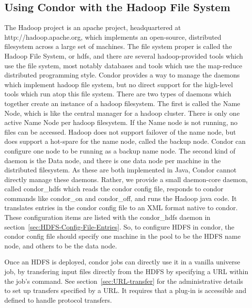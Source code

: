 \subsection{\label{sec:Condor-HDFS}Using Condor with the Hadoop File System}

The Hadoop project is an apache project, headquartered at http://hadoop.apache.org, 
which implements an open-source, distributed filesystem across a large set
of machines.  The file system proper is called the Hadoop File System, or hdfs, and 
there are several hadoop-provided tools which use the file system, most notably
databases and tools which use the map-reduce distributed programming style.  Condor
provides a way to manage the daemons which implement hadoop file system, but no
direct support for the high-level tools which run atop this file system.  There
are two types of daemons which together create an instance of a hadoop filesystem.
The first is called the Name Node, which is like the central manager for a 
hadoop cluster.  There is only one active Name Node per hadoop filesystem.  If
the Name node is not running, no files can be accessed.  Hadoop does not support
failover of the name node, but does support a hot-spare for the name node, called
the backup node.  Condor can configure one node to be running as a backup name node.
The second
kind of daemon is the Data node, and there is one data node per machine in the 
distributed filesystem.  As these are both implemented in Java, Condor cannot directly
manage these daemons.  Rather, we provide a small daemon-core daemon, called
condor\_hdfs which reads the condor config file, responds to condor commands like
condor\_on and condor\_off, and runs the Hadoop java code.  It translates entries
in the condor config file to an XML format native to condor.  These configuration
items are listed with the condor\_hdfs daemon in section~\ref{sec:HDFS-Config-File-Entries}. 
So, to configure HDFS in condor, the condor config file should specify one machine in the
pool to be the HDFS name node, and others to be the data node.

Once an HDFS is deployed, condor jobs can directly use it in a vanilla universe job, by transfering input files directly from the HDFS by specifying a URL within the
job's  command. 
See section~\ref{sec:URL-transfer} for the administrative details
to set up transfers specified by a URL.
It requires that a plug-in is accessible and defined to handle
 protocol transfers. 

